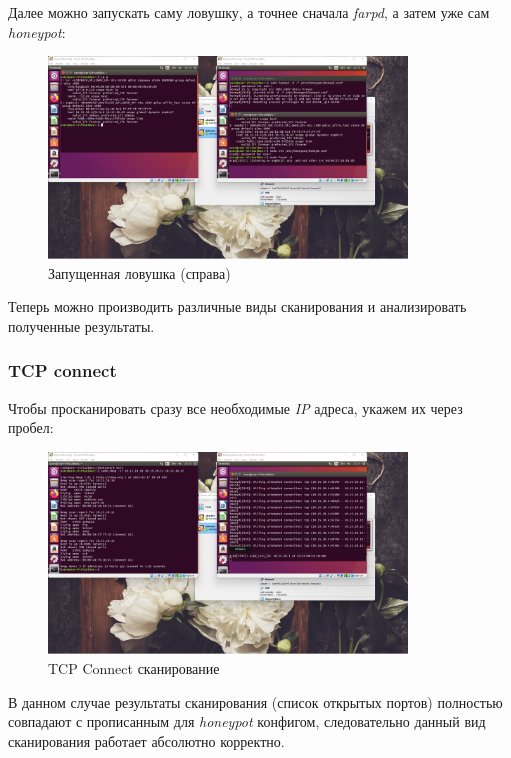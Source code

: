 \documentclass[a4paper]{article}
\begin{document}
  Далее можно запускать саму ловушку, а точнее сначала \textit{farpd},
  а затем уже сам \textit{honeypot}:
  
  \begin{figure}[H]
    \centering
    \includegraphics[width=0.85\textwidth]{01_00 (23)}
    \caption{Запущенная ловушка (справа)}
  \end{figure}

  Теперь можно производить различные виды сканирования и анализировать полученные результаты.

  \subsubsection{TCP connect}

  Чтобы просканировать сразу все необходимые \textit{IP} адреса, укажем их через пробел:

  \begin{figure}[H]
    \centering
    \includegraphics[width=0.85\textwidth]{01_00 (26)}
    \caption{TCP Connect сканирование}
  \end{figure}

  В данном случае результаты сканирования (список открытых портов) полностью
  совпадают с прописанным для \textit{honeypot} конфигом, следовательно
  данный вид сканирования работает абсолютно корректно.
\end{document}
